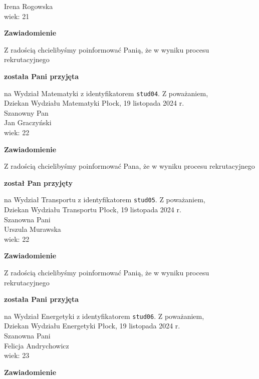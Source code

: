 \documentclass[12pt,a4paper]{article}
\begin{document}
Irena Rogowska \\
wiek: 21
\bigskip
\begin{center}
    {\Large\textbf{Zawiadomienie}}
\end{center}
\bigskip 
Z radością chcielibyśmy poinformować Panią, że w wyniku procesu rekrutacyjnego
\begin{center}
\textsf{\textbf{została Pani przyjęta}}
\end{center}
na Wydział Matematyki z identyfikatorem \verb|stud04|. 
\vspace{2cm}
\noindent
Z poważaniem, \\
Dziekan
Wydziału Matematyki
\newpage
\hfill Płock, 19 listopada 2024 r. \\
\noindent
Szanowny Pan \\
Jan Graczyński  \\
wiek: 22
\bigskip
\begin{center}
    {\Large\textbf{Zawiadomienie}}
\end{center}
\bigskip 
Z radością chcielibyśmy poinformować Pana, że w wyniku procesu rekrutacyjnego
\begin{center}
\textsf{\textbf{został Pan przyjęty}}
\end{center}
na Wydział Transportu z identyfikatorem \verb|stud05|. 
\vspace{2cm}
\noindent
Z poważaniem, \\
Dziekan
Wydziału Transportu
\newpage
\hfill Płock, 19 listopada 2024 r. \\
\noindent
Szanowna Pani \\
Urszula Murawska  \\
wiek: 22
\bigskip
\begin{center}
    {\Large\textbf{Zawiadomienie}}
\end{center}
\bigskip 
Z radością chcielibyśmy poinformować Panią, że w wyniku procesu rekrutacyjnego
\begin{center}
\textsf{\textbf{została Pani przyjęta}}
\end{center}
na Wydział Energetyki z identyfikatorem \verb|stud06|. 
\vspace{2cm}
\noindent
Z poważaniem, \\
Dziekan
Wydziału Energetyki
\newpage
\hfill Płock, 19 listopada 2024 r. \\
\noindent
Szanowna Pani \\
Felicja Andrychowicz \\
wiek: 23
\bigskip
\begin{center}
    {\Large\textbf{Zawiadomienie}}
\end{center}
\end{document}
